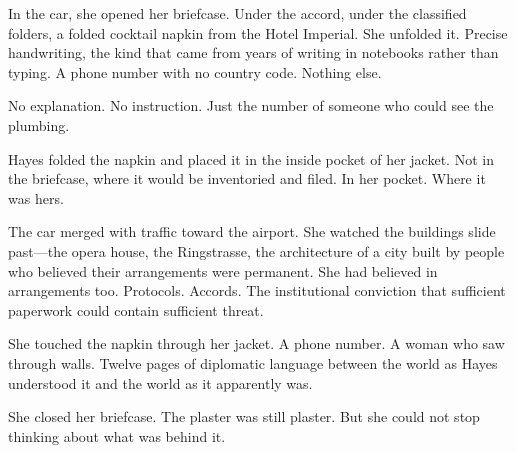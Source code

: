In the car, she opened her briefcase. Under the accord, under the classified folders, a folded cocktail napkin from the Hotel Imperial. She unfolded it. Precise handwriting, the kind that came from years of writing in notebooks rather than typing. A phone number with no country code. Nothing else.

No explanation. No instruction. Just the number of someone who could see the plumbing.

Hayes folded the napkin and placed it in the inside pocket of her jacket. Not in the briefcase, where it would be inventoried and filed. In her pocket. Where it was hers.

The car merged with traffic toward the airport. She watched the buildings slide past---the opera house, the Ringstrasse, the architecture of a city built by people who believed their arrangements were permanent. She had believed in arrangements too. Protocols. Accords. The institutional conviction that sufficient paperwork could contain sufficient threat.

She touched the napkin through her jacket. A phone number. A woman who saw through walls. Twelve pages of diplomatic language between the world as Hayes understood it and the world as it apparently was.

She closed her briefcase. The plaster was still plaster. But she could not stop thinking about what was behind it.

